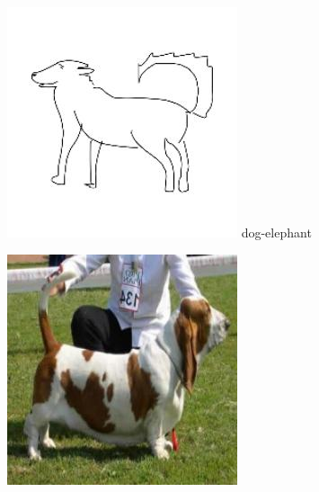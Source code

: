 \documentclass{article}
\begin{document}
\begin{center}
    \noindent 
    \begin{minipage}{0.142\textwidth}
        \includegraphics[width=\linewidth]{./pic/misclassified_r0_p1_1641.jpg}
        dog-elephant
    \end{minipage}%
    \begin{minipage}{0.142\textwidth}
        \includegraphics[width=\linewidth]{./pic/misclassified_r0_p5_2723.jpg}

\end{minipage}
\end{center}
\end{document}
